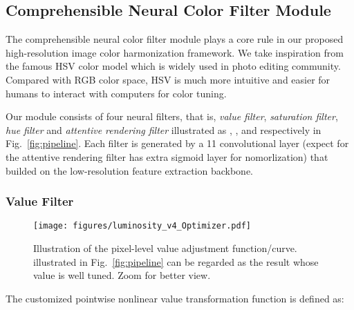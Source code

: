 \documentclass[runningheads]{llncs}
\begin{document}
    
    
    
    \subsection{Comprehensible Neural Color Filter Module}
    \label{subsection:DCCF}
    
    The comprehensible neural color filter module plays a core rule in our proposed high-resolution image color harmonization framework.
We take inspiration from the famous HSV color model which is widely used in photo editing community. 
    Compared with RGB color space, HSV is much more intuitive and easier for humans to interact with computers for color tuning.
    
    Our module consists of four neural filters, that is, \textit{value filter}, \textit{saturation filter}, \textit{hue filter} and \textit{attentive rendering filter} illustrated as , ,  and  respectively in Fig.~\ref{fig:pipeline}.
Each filter is generated by a 11 convolutional layer (expect for the attentive rendering filter has extra sigmoid layer for nomorlization) that builded on the low-resolution feature extraction backbone.
    










    
    
\subsubsection{Value Filter} 




    
    \begin{figure}[!thb]
        \centering
        \vspace{-30pt}
        \texttt{[image: figures/luminosity\_v4\_Optimizer.pdf]}\\
        \caption{
            \small Illustration of the pixel-level value adjustment function/curve.  illustrated in Fig.~\ref{fig:pipeline} can be regarded as the result whose value is well tuned. Zoom for better view.
            }
        \vspace{-15pt}
        \label{fig:luminosity_curve}
    \end{figure}
    
    
    The customized pointwise nonlinear value transformation function  is defined as:
     
\end{document}
